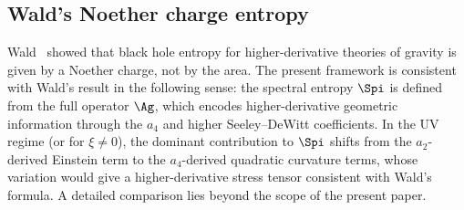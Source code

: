   \subsection{Wald's Noether charge entropy}
    \label{subsec:wald}

    Wald~\cite{Wald1993} showed that black hole entropy for higher-derivative theories
    of gravity is given by a Noether charge, not by the area.
    The present framework is consistent with Wald's result in the following sense:
    the spectral entropy $\Spi$ is defined from the full operator $\Ag$, which encodes
    higher-derivative geometric information through the $a_4$ and higher Seeley--DeWitt
    coefficients.
    In the UV regime (or for $\xi \neq 0$), the dominant contribution to $\Spi$ shifts
    from the $a_2$-derived Einstein term to the $a_4$-derived quadratic curvature terms,
    whose variation would give a higher-derivative stress tensor consistent with Wald's
    formula.
    A detailed comparison lies beyond the scope of the present paper.

